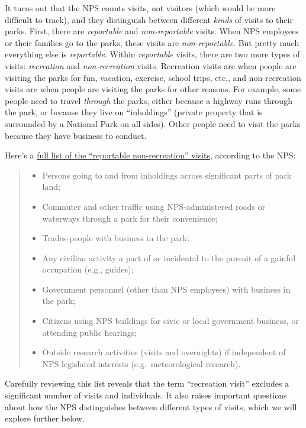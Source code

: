 \documentclass[
  letterpaper,
  DIV=11,
  numbers=noendperiod]{scrartcl}
\providecommand{\tightlist}{%
  \setlength{\itemsep}{0pt}\setlength{\parskip}{0pt}}\usepackage{longtable,booktabs,array}
\begin{document}
It turns out that the NPS counts visits, not visitors (which would be
more difficult to track), and they distinguish between different
\emph{kinds} of visits to their parks. First, there are
\emph{reportable} and \emph{non-reportable} visits. When NPS employees
or their families go to the parks, these visits are
\emph{non-reportable}. But pretty much everything else is
\emph{reportable}. Within \emph{reportable} visits, there are two more
types of visits: \emph{recreation} and \emph{non-recreation} visits.
Recreation visits are when people are visiting the parks for fun,
vacation, exercise, school trips, etc., and non-recreation visits are
when people are visiting the parks for other reasons. For example, some
people need to travel \emph{through} the parks, either because a highway
runs through the park, or because they live on ``inholdings'' (private
property that is surrounded by a National Park on all sides). Other
people need to visit the parks because they have business to conduct.

Here's a
\href{https://www.nps.gov/subjects/socialscience/nps-visitor-use-statistics-definitions.htm}{full
list of the ``reportable non-recreation'' visits}, according to the NPS:

\begin{quote}
\begin{itemize}
\tightlist
\item
  Persons going to and from inholdings across significant parts of park
  land;
\item
  Commuter and other traffic using NPS-administered roads or waterways
  through a park for their convenience;
\item
  Trades-people with business in the park;
\item
  Any civilian activity a part of or incidental to the pursuit of a
  gainful occupation (e.g., guides);
\item
  Government personnel (other than NPS employees) with business in the
  park;
\item
  Citizens using NPS buildings for civic or local government business,
  or attending public hearings;
\item
  Outside research activities (visits and overnights) if independent of
  NPS legislated interests (e.g.~meteorological research).
\end{itemize}
\end{quote}

Carefully reviewing this list reveals that the term ``recreation visit''
excludes a significant number of visits and individuals. It also raises
important questions about how the NPS distinguishes between different
types of visits, which we will explore further below.
\end{document}
